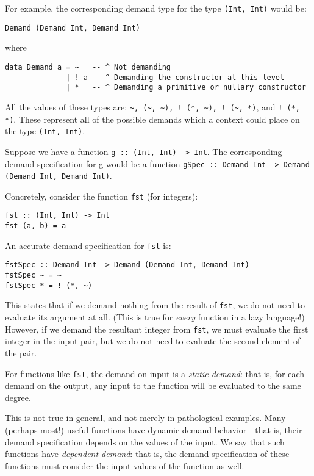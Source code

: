 \documentclass{article}
\begin{document}
For example, the corresponding demand type for the type \verb|(Int, Int)| would be:

\verb|Demand (Demand Int, Demand Int)|

where

\begin{verbatim}
data Demand a = ~   -- ^ Not demanding
              | ! a -- ^ Demanding the constructor at this level
              | *   -- ^ Demanding a primitive or nullary constructor
\end{verbatim}

All the values of these types are:
\verb|~, (~, ~), ! (*, ~), ! (~, *)|, and \verb|! (*, *)|. These
represent all of the possible demands which a context could place on
the type \verb|(Int, Int)|.

Suppose we have a function \verb|g :: (Int, Int) -> Int|. The corresponding
demand specification for g would be a function
\verb|gSpec :: Demand Int -> Demand (Demand Int, Demand Int)|.

Concretely, consider the function \verb|fst| (for integers):

\begin{verbatim}
fst :: (Int, Int) -> Int
fst (a, b) = a
\end{verbatim}

An accurate demand specification for \verb|fst| is:

\begin{verbatim}
fstSpec :: Demand Int -> Demand (Demand Int, Demand Int)
fstSpec ~ = ~
fstSpec * = ! (*, ~)
\end{verbatim}

This states that if we demand nothing from the result of \verb|fst|, we do
not need to evaluate its argument at all. (This is true for
\emph{every} function in a lazy language!) However, if we demand the
resultant integer from \verb|fst|, we must evaluate the first integer in
the input pair, but we do not need to evaluate the second element of
the pair.

For functions like \verb|fst|, the demand on input is a \emph{static
  demand}: that is, for each demand on the output, any input to the
function will be evaluated to the same degree.

This is not true in general, and not merely in pathological
examples. Many (perhaps most!) useful functions have dynamic demand
behavior---that is, their demand specification depends on the values
of the input. We say that such functions have \emph{dependent demand}:
that is, the demand specification of these functions must consider the
input values of the function as well.
\end{document}
